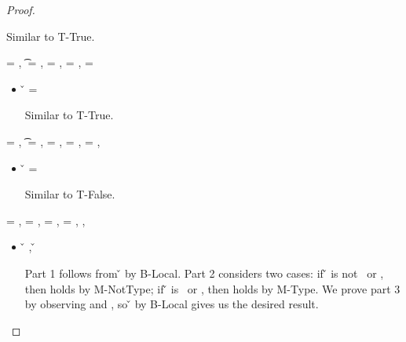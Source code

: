 \begin{lemma}
\begin{proof}
\begin{case}[T-Class]
\begin{itemize}
\begin{subcase}[B-Val]
        Similar to T-True.
      \end{subcase}
  \end{itemize}
\end{case}

\begin{case}[T-Instance] \e{} = {\classvalue{\classhint{}} {\overrightarrow {\classfieldpair{\fld{}} {\v{}}}}},
  \t{} = {\class{}},
  \thenprop{\prop{}} = {\topprop{}},
  \elseprop{\prop{}} = {\botprop{}},
  \object{} = {\emptyobject{}}

  \begin{itemize}
    \item[]
      \begin{subcase}[B-Val] \v{} = {\classvalue{\classhint{}} {\overrightarrow {\classfieldpair{\fld{}} {\v{}}}}}

        Similar to T-True.
      \end{subcase}
  \end{itemize}
\end{case}


\begin{case}[T-Nil]
\e{} = \nil, \t{} = \Nil, \thenprop{\prop{}} = \botprop{}, \elseprop{\prop{}} = \topprop{}, \object{} = \emptyobject{},

\begin{itemize}
  \item[] 
    \begin{subcase}[B-Val] 
      \v{} = \nil{}

      Similar to T-False.
\end{subcase}

\end{itemize}

\end{case}

\begin{case}[T-Local]
  \e{} = \x{}, \thenprop{\prop{}} = {\notprop {\falsy{}} {\x{}}},
  \elseprop{\prop{}} = {\isprop {\falsy{}} {\x{}}},
\object{} = \x{}, 
\inpropenv{\propenv{}}{\isprop{\t{}}{\x{}}},

\begin{itemize}
  \item[]
\begin{subcase}[B-Local]
{ \inopenv {\openv{}} {\x{}} {\v{}} },
{ \opsem {\openv{}} {\x{}} {\v{}} }

Part 1 follows from \inopenv{\openv{}}{\x{}} {\v{}} by B-Local.
Part 2 considers two cases: if \v{} is not \false\ or \nil, then 
\satisfies{\openv{}}{\notprop{\falsy}{\x{}}} holds by M-NotType; if \v{} is \false\ or \nil, then 
\satisfies{\openv{}}{\isprop{\falsy}{\x{}}} holds by M-Type.
We prove part 3 by observing
\inpropenv{\propenv{}}{\isprop{\t{}}{\x{}}}
and
\satisfies{\openv{}}{\propenv{}},
so
{ \inopenv {\openv{}} {\x{}} {\v{}} }
by B-Local
gives us the desired result.
\end{subcase}
\end{itemize}


\end{case}
\end{proof}
\end{lemma}
